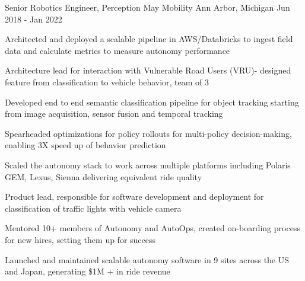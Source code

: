 \begin{cventries}
  \cventry
    {Senior Robotics Engineer, Perception} %
    {May Mobility} %
    {Ann Arbor, Michigan} %
    {Jun 2018 - Jan 2022} %
    {
      \begin{cvitems} %
        \item {Architected and deployed a scalable pipeline in AWS/Databricks to ingest field data and calculate metrics to measure autonomy performance}
        \item {Architecture lead for interaction with Vulnerable Road Users (VRU)- designed feature from classification to vehicle behavior, team of 3}
        \item {Developed end to end semantic classification pipeline for object tracking starting from image acquisition, sensor fusion and temporal tracking}
		\item {Spearheaded optimizations for policy rollouts for multi-policy decision-making, enabling 3X speed up of behavior prediction }
		\item {Scaled the autonomy stack to work across multiple platforms including Polaris GEM, Lexus, Sienna delivering equivalent ride quality}
        \item {Product lead, responsible for software development and deployment for classification of traffic lights with vehicle camera}
        \item {Mentored 10+ members of Autonomy and AutoOps, created on-boarding process for new hires, setting them up for success}
        \item {Launched and maintained scalable autonomy software in 9 sites across the US and Japan, generating \$1M + in ride revenue }
      \end{cvitems}
    }


\end{cventries}

